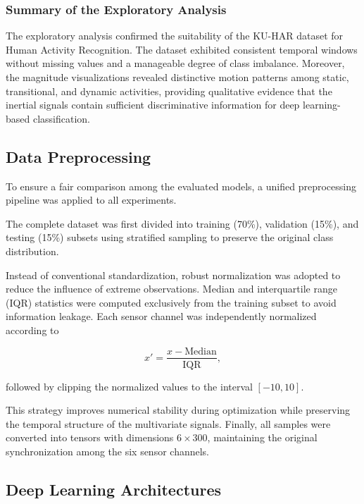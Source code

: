 \documentclass[journal]{IEEEtran}
\begin{document}
\subsubsection{Summary of the Exploratory Analysis}

The exploratory analysis confirmed the suitability of the KU-HAR dataset for Human Activity Recognition. The dataset exhibited consistent temporal windows without missing values and a manageable degree of class imbalance. Moreover, the magnitude visualizations revealed distinctive motion patterns among static, transitional, and dynamic activities, providing qualitative evidence that the inertial signals contain sufficient discriminative information for deep learning-based classification.


\subsection{Data Preprocessing}

To ensure a fair comparison among the evaluated models, a unified preprocessing pipeline was applied to all experiments.

The complete dataset was first divided into training (70\%), validation (15\%), and testing (15\%) subsets using stratified sampling to preserve the original class distribution.

Instead of conventional standardization, robust normalization was adopted to reduce the influence of extreme observations. Median and interquartile range (IQR) statistics were computed exclusively from the training subset to avoid information leakage. Each sensor channel was independently normalized according to

\begin{equation}
x'=\frac{x-\mathrm{Median}}{\mathrm{IQR}},
\end{equation}

followed by clipping the normalized values to the interval $[-10,10]$.

This strategy improves numerical stability during optimization while preserving the temporal structure of the multivariate signals. Finally, all samples were converted into tensors with dimensions \(6 \times 300\), maintaining the original synchronization among the six sensor channels.


\subsection{Deep Learning Architectures}
\end{document}
